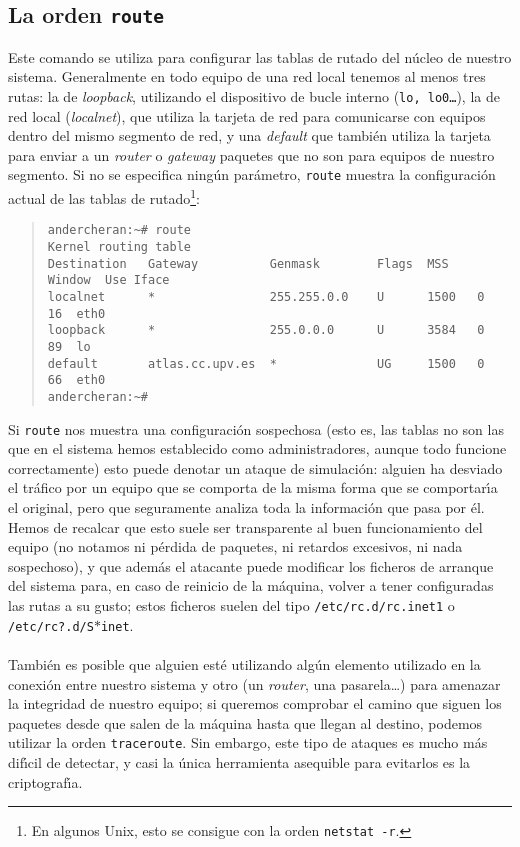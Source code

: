 \subsection{La orden {\tt route}}
Este comando se utiliza para configurar las tablas de rutado del n\'ucleo de
nuestro sistema. Generalmente en todo equipo de una red local tenemos al menos
tres rutas: la de {\it loopback}, utilizando el dispositivo de bucle interno
({\tt lo, lo0\ldots}), la de red local ({\it localnet}), que utiliza la tarjeta 
de red para comunicarse con equipos dentro del mismo segmento de red, y una 
{\it default} que tambi\'en utiliza la tarjeta para enviar a un {\it router} o
{\it gateway} paquetes que no son para equipos de nuestro segmento. Si no se
especifica ning\'un par\'ametro, {\tt route} muestra la configuraci\'on actual 
de las tablas de rutado\footnote{En algunos Unix, esto se consigue con la
orden {\tt netstat -r}.}:
\tt
\begin{quote}
\begin{verbatim}
andercheran:~# route
Kernel routing table
Destination   Gateway          Genmask        Flags  MSS    Window  Use Iface
localnet      *                255.255.0.0    U      1500   0       16  eth0
loopback      *                255.0.0.0      U      3584   0       89  lo
default       atlas.cc.upv.es  *              UG     1500   0       66  eth0
andercheran:~# 
\end{verbatim}
\end{quote}
\rm
Si {\tt route} nos muestra una configuraci\'on sospechosa (esto es, las tablas
no son las que en el sistema hemos establecido como administradores, aunque
todo funcione correctamente) esto puede denotar un ataque de simulaci\'on: 
alguien ha desviado el tr\'afico por un equipo que se comporta de la misma
forma que se comportar\'{\i}a el original, pero que seguramente analiza toda
la informaci\'on que pasa por \'el. Hemos de recalcar que esto suele ser 
transparente al buen funcionamiento del equipo (no notamos ni p\'erdida de
paquetes, ni retardos excesivos, ni nada sospechoso), y que adem\'as el 
atacante puede modificar los ficheros de arranque del sistema para, en caso de
reinicio de la m\'aquina, volver a tener configuradas las rutas a su gusto;
estos ficheros suelen del tipo {\tt /etc/rc.d/rc.inet1} o {\tt 
/etc/rc?.d/S$\ast$inet}.\\
\\Tambi\'en es posible que alguien est\'e utilizando alg\'un elemento utilizado
en la conexi\'on entre nuestro sistema y otro (un {\it router}, una 
pasarela\ldots) para amenazar la integridad de nuestro equipo; si queremos 
comprobar el camino que siguen los paquetes desde que salen de la m\'aquina 
hasta que llegan al destino, podemos utilizar la orden
{\tt traceroute}. Sin embargo, este tipo de ataques es mucho m\'as dif\'{\i}cil
de detectar, y casi la \'unica herramienta asequible para evitarlos es la
criptograf\'{\i}a.
